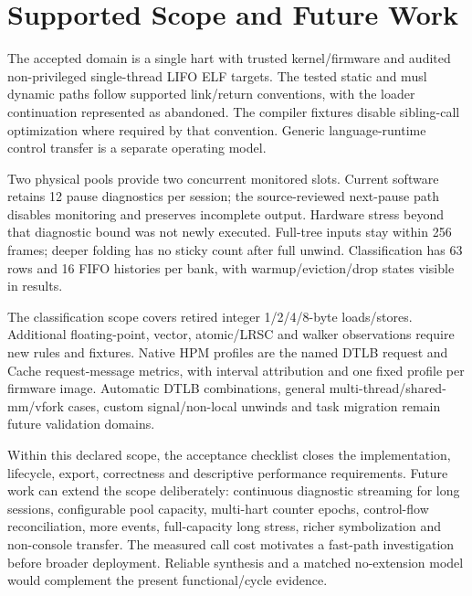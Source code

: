 \section{Supported Scope and Future Work}
The accepted domain is a single hart with trusted kernel/firmware and audited non-privileged single-thread LIFO ELF targets. The tested static and musl dynamic paths follow supported link/return conventions, with the loader continuation represented as abandoned. The compiler fixtures disable sibling-call optimization where required by that convention. Generic language-runtime control transfer is a separate operating model.

Two physical pools provide two concurrent monitored slots. Current software retains 12 pause diagnostics per session; the source-reviewed next-pause path disables monitoring and preserves incomplete output. Hardware stress beyond that diagnostic bound was not newly executed. Full-tree inputs stay within 256 frames; deeper folding has no sticky count after full unwind. Classification has 63 rows and 16 FIFO histories per bank, with warmup/eviction/drop states visible in results.

The classification scope covers retired integer 1/2/4/8-byte loads/stores. Additional floating-point, vector, atomic/LRSC and walker observations require new rules and fixtures. Native HPM profiles are the named DTLB request and Cache request-message metrics, with interval attribution and one fixed profile per firmware image. Automatic DTLB combinations, general multi-thread/shared-mm/vfork cases, custom signal/non-local unwinds and task migration remain future validation domains.

Within this declared scope, the acceptance checklist closes the implementation, lifecycle, export, correctness and descriptive performance requirements. Future work can extend the scope deliberately: continuous diagnostic streaming for long sessions, configurable pool capacity, multi-hart counter epochs, control-flow reconciliation, more events, full-capacity long stress, richer symbolization and non-console transfer. The measured call cost motivates a fast-path investigation before broader deployment. Reliable synthesis and a matched no-extension model would complement the present functional/cycle evidence.
